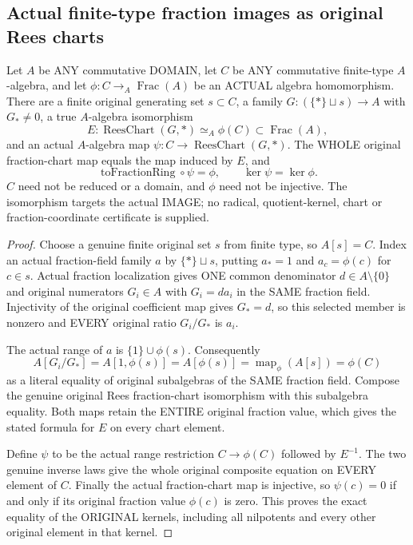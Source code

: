 \subsection{Actual finite-type fraction images as original Rees charts}

\begin{lemma}
\label{scheme:actual-finite-type-fraction-image-chart}
\leanok
{}
Let $A$ be ANY commutative DOMAIN, let $C$ be ANY commutative finite-type
$A$-algebra, and let $\phi:C\to_A\operatorname{Frac}(A)$ be an ACTUAL
algebra homomorphism.  There are a finite original generating set $s\subset C$,
a family $G:(\{*\}\sqcup s)\to A$ with $G_*\ne0$, a true $A$-algebra
isomorphism
\[
 E:\operatorname{ReesChart}(G,*)\simeq_A\phi(C)\subset\operatorname{Frac}(A),
\]
and an actual $A$-algebra map $\psi:C\to\operatorname{ReesChart}(G,*)$.
The WHOLE original fraction-chart map equals the map induced by $E$, and
\[
 \operatorname{toFractionRing}\circ\psi=\phi,
 \qquad \ker\psi=\ker\phi.
\]
$C$ need not be reduced or a domain, and $\phi$ need not be injective.
The isomorphism targets the actual IMAGE; no radical, quotient-kernel, chart
or fraction-coordinate certificate is supplied.
\end{lemma}
\begin{proof}
Choose a genuine finite original set $s$ from finite type, so $A[s]=C$.
Index an actual fraction-field family $a$ by $\{*\}\sqcup s$, putting
$a_*=1$ and $a_c=\phi(c)$ for $c\in s$.  Actual fraction localization gives
ONE common denominator $d\in A\setminus\{0\}$ and original numerators
$G_i\in A$ with $G_i=d a_i$ in the SAME fraction field.  Injectivity of the
original coefficient map gives $G_*=d$, so this selected member is nonzero and
EVERY original ratio $G_i/G_*$ is $a_i$.

The actual range of $a$ is $\{1\}\cup\phi(s)$.  Consequently
\[
 A[G_i/G_*]=A[1,\phi(s)]=A[\phi(s)]
   =\operatorname{map}_{\phi}(A[s])=\phi(C)
\]
as a literal equality of original subalgebras of the SAME fraction field.
Compose the genuine original Rees fraction-chart isomorphism with this
subalgebra equality.  Both maps retain the ENTIRE original fraction value,
which gives the stated formula for $E$ on every chart element.

Define $\psi$ to be the actual range restriction $C\to\phi(C)$ followed by
$E^{-1}$.  The two genuine inverse laws give the whole original composite
equation on EVERY element of $C$.  Finally the actual fraction-chart map is
injective, so $\psi(c)=0$ if and only if its original fraction value
$\phi(c)$ is zero.  This proves the exact equality of the ORIGINAL kernels,
including all nilpotents and every other original element in that kernel.
\end{proof}

